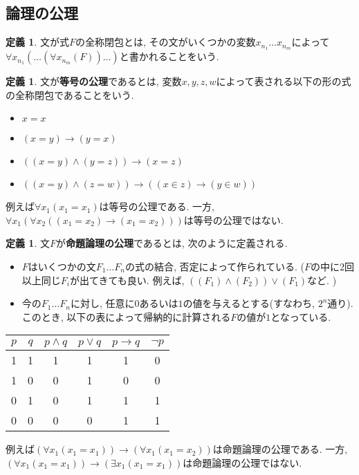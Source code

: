 \documentclass[a4paper]{bxjsarticle}
\theoremstyle{definition}
\newtheorem{defn}[thm]{定義}
\begin{document}
    \subsection{論理の公理}
    \begin{defn}
        文が式$F$の全称閉包とは, その文がいくつかの変数$x_{n_1} \dots x_{n_m}$によって$\forall x_{n_1} (\dots (\forall x_{n_m} (F)) \dots)$と書かれることをいう. 
    \end{defn}
    \begin{defn}
        文が\textbf{等号の公理}であるとは, 変数$x,y,z,w$によって表される以下の形の式の全称閉包であることをいう.
        \begin{itemize}
            \item $x=x$
            \item $(x=y) \to (y=x)$
            \item $((x=y) \land (y=z)) \to (x=z)$
            \item $((x=y) \land (z=w)) \to ((x \in z) \to (y \in w))$
            
        \end{itemize}
        
        例えば$\forall x_1 (x_1 = x_1)$は等号の公理である. 一方, $\forall x_1 (\forall x_2 ((x_1 = x_2) \to (x_1 = x_2)))$は等号の公理ではない. 
    \end{defn}
    \begin{defn}
        文$F$が\textbf{命題論理の公理}であるとは, 次のように定義される.
        
        \begin{itemize}
            \item $F$はいくつかの文$F_1 \dots F_n$の式の結合, 否定によって作られている. ($F$の中に2回以上同じ$F_i$が出てきても良い. 例えば, $((F_1) \land (F_2)) \lor (F_1)$など. )
            \item 今の$F_1 \dots F_n$に対し, 任意に$0$あるいは$1$の値を与えるとする(すなわち, $2^n$通り). このとき, 以下の表によって帰納的に計算される$F$の値が$1$となっている.
        \end{itemize}
        
        \begin{table}[htbp]
            \centering
            \begin{tabular}{c|c|c|c|c|c}
                $p$ & $q$ & $p \land q$ & $p \lor q$ & $p \to q$ & $\lnot p$ \\ \hline
                1 & 1 & 1 & 1 & 1 & 0 \\ \hline
                1 & 0 & 0 & 1 & 0 & 0 \\ \hline
                0 & 1 & 0 & 1 & 1 & 1 \\ \hline
                0 & 0 & 0 & 0 & 1 & 1 \\ \hline
            \end{tabular}
        \end{table}
        
        例えば$(\forall x_1 (x_1 = x_1)) \to (\forall x_1 (x_1 = x_2))$は命題論理の公理である. 一方, $(\forall x_1 (x_1 = x_1)) \to (\exists x_1 (x_1 = x_1))$は命題論理の公理ではない.
    \end{defn}
\end{document}
